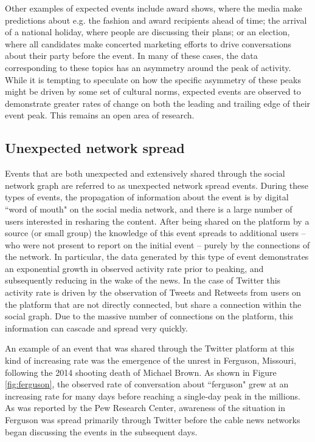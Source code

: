 \documentclass{article}
\begin{document}
Other examples of expected events include award shows, where the media make predictions about e.g. the fashion and award recipients ahead of time; the arrival of a national holiday, where people are discussing their plans; or an election, where all candidates make concerted marketing efforts to drive conversations about their party before the event. In many of these cases, the data corresponding to these topics has an asymmetry around the peak of activity. While it is tempting to speculate on how the specific asymmetry of these peaks might be driven by some set of cultural norms, expected events are observed to demonstrate greater rates of change on both the leading and trailing edge of their event peak. This remains an open area of research.  

\subsection{Unexpected network spread}
\label{sec:models_unex-net}

Events that are both unexpected and extensively shared through the social network graph are referred to as unexpected network spread events. During these types of events, the propagation of information about the event is by digital ``word of mouth" on the social media network, and there is a large number of users interested in resharing the content. After being shared on the platform by a source (or small group) the knowledge of this event spreads to additional users -- who were not present to report on the initial event -- purely by the connections of the network. In particular, the data generated by this type of event demonstrates an exponential growth in observed activity rate prior to peaking, and subsequently reducing in the wake of the news. In the case of Twitter this activity rate is driven by the observation of Tweets and Retweets from users on the platform that are not directly connected, but share a connection within the social graph. Due to the massive number of connections on the platform, this information can cascade and spread very quickly. 

An example of an event that was shared through the Twitter platform at this kind of increasing rate was the emergence of the unrest in Ferguson, Missouri, following the 2014 shooting death of Michael Brown.\cite{wiki:ferguson} As shown in Figure \ref{fig:ferguson}, the observed rate of conversation about ``ferguson" grew at an increasing rate for many days before reaching a single-day peak in the millions. As was reported by the Pew Research Center, awareness of the situation in Ferguson was spread primarily through Twitter before the cable news networks began discussing the events in the subsequent days.\cite{Hitlin2014} 
\end{document}
